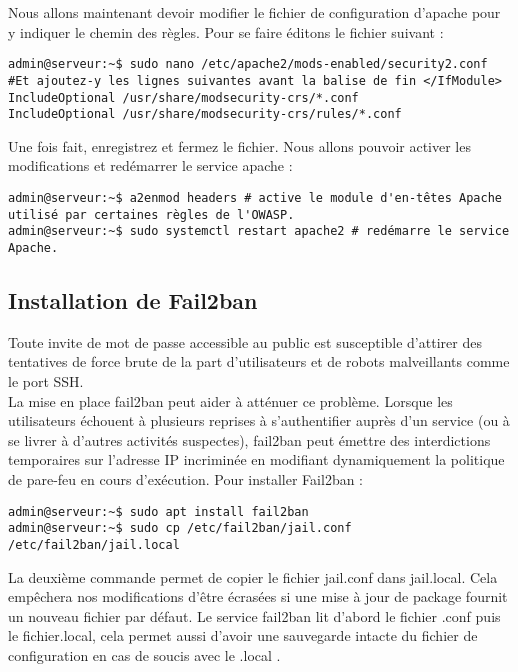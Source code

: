 Nous allons maintenant devoir modifier le fichier de configuration d'apache pour y indiquer le chemin des règles. Pour se faire éditons le fichier suivant : 
 \begin{verbatim}
admin@serveur:~$ sudo nano /etc/apache2/mods-enabled/security2.conf
#Et ajoutez-y les lignes suivantes avant la balise de fin </IfModule>
IncludeOptional /usr/share/modsecurity-crs/*.conf
IncludeOptional /usr/share/modsecurity-crs/rules/*.conf
\end{verbatim}
Une fois fait, enregistrez et fermez le fichier.
Nous allons pouvoir activer les modifications et redémarrer le service apache :
 \begin{verbatim}
admin@serveur:~$ a2enmod headers # active le module d'en-têtes Apache utilisé par certaines règles de l'OWASP.
admin@serveur:~$ sudo systemctl restart apache2 # redémarre le service Apache.
\end{verbatim}




\color{black}

\subsection{Installation de Fail2ban}
Toute invite de mot de passe accessible au public est susceptible d'attirer des tentatives de force brute de la part d'utilisateurs et de robots malveillants comme le port SSH. \\
La mise en place fail2ban peut aider à atténuer ce problème. Lorsque les utilisateurs échouent à plusieurs reprises à s'authentifier auprès d'un service (ou à se livrer à d'autres activités suspectes), fail2ban peut émettre des interdictions temporaires sur l'adresse IP incriminée en modifiant dynamiquement la politique de pare-feu en cours d'exécution.
Pour installer Fail2ban : 
 \begin{verbatim}
admin@serveur:~$ sudo apt install fail2ban
admin@serveur:~$ sudo cp /etc/fail2ban/jail.conf /etc/fail2ban/jail.local
\end{verbatim}
La deuxième commande permet de copier le fichier jail.conf dans jail.local. Cela empêchera nos modifications d'être écrasées si une mise à jour de package fournit un nouveau fichier par défaut. Le service fail2ban lit d'abord le fichier .conf puis le fichier.local, cela permet aussi d'avoir une sauvegarde intacte du fichier de configuration en cas de soucis avec le .local . \\


